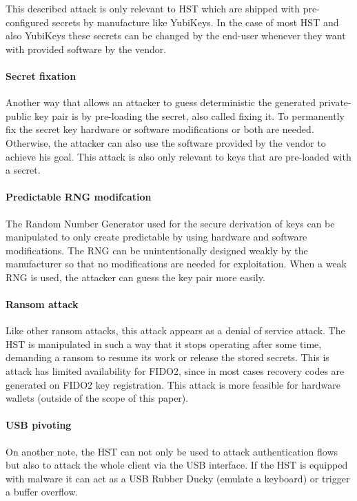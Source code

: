 \documentclass[runningheads]{llncs}
\begin{document}
This described attack is only relevant to HST which are shipped with pre-configured secrets by manufacture like YubiKeys. In the case of most HST and also YubiKeys these secrets can be changed by the end-user whenever they want with provided software by the vendor.

\paragraph{Secret fixation}
Another way that allows an attacker to guess deterministic the generated private-public key pair is by pre-loading the secret, also called fixing it. To permanently fix the secret key hardware or software modifications or both are needed. Otherwise, the attacker can also use the software provided by the vendor to achieve his goal. This attack is also only relevant to keys that are pre-loaded with a secret.

\paragraph{Predictable RNG modifcation}
The Random Number Generator used for the secure derivation of keys can be manipulated to only create predictable by using hardware and software modifications. The RNG can be unintentionally designed weakly by the manufacturer so that no modifications are needed for exploitation. When a weak RNG is used, the attacker can guess the key pair more easily.

\paragraph{Ransom attack}
Like other ransom attacks, this attack appears as a denial of service attack. The HST is manipulated in such a way that it stops operating after some time, demanding a ransom to resume its work or release the stored secrets. This is attack has limited availability for FIDO2, since in most cases recovery codes are generated on FIDO2 key registration. This attack is more feasible for hardware wallets (outside of the scope of this paper).

\paragraph{USB pivoting}
On another note, the HST can not only be used to attack authentication flows but also to attack the whole client via the USB interface. If the HST is equipped with malware it can act as a USB Rubber Ducky (emulate a keyboard) or trigger a buffer overflow.
\end{document}

